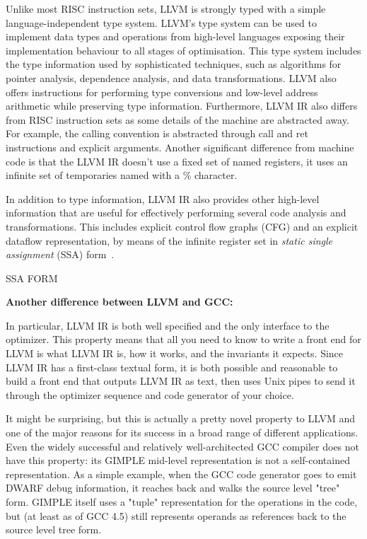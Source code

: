Unlike most RISC instruction sets, LLVM is strongly typed with a simple language-independent type system.
LLVM's type system can be used to implement data types and operations from high-level languages exposing their implementation behaviour to all stages of optimisation.
This type system includes the type information used by sophisticated techniques, such as algorithms for pointer analysis, dependence analysis, and data transformations.
LLVM also offers instructions for performing type conversions and low-level address arithmetic while preserving type information.
Furthermore, LLVM IR also differs from RISC instruction sets as some details of the machine are abstracted away.
For example, the calling convention is abstracted through call and ret instructions and explicit arguments.
Another significant difference from machine code is that the LLVM IR doesn't use a fixed set of named registers, it uses an infinite set of temporaries named with a \% character.

In addition to type information, LLVM IR also provides other high-level information that are useful for effectively performing several code analysis and transformations.
This includes explicit control flow graphs (CFG) and an explicit dataflow representation, by means of the infinite register set in \textit{static single assignment} (SSA) form~\citep{}.

SSA FORM

\textbf{Another difference between LLVM and GCC:}

In particular, LLVM IR is both well specified and the only interface to the optimizer.
This property means that all you need to know to write a front end for LLVM is what LLVM IR is, how it works, and the invariants it expects.
Since LLVM IR has a first-class textual form, it is both possible and reasonable to build a front end that outputs LLVM IR as text, then uses Unix pipes to send it through the optimizer sequence and code generator of your choice.

It might be surprising, but this is actually a pretty novel property to LLVM and one of the major reasons for its success in a broad range of different applications.
Even the widely successful and relatively well-architected GCC compiler does not have this property: its GIMPLE mid-level representation is not a self-contained representation.
As a simple example, when the GCC code generator goes to emit DWARF debug information, it reaches back and walks the source level "tree" form.
GIMPLE itself uses a "tuple" representation for the operations in the code, but (at least as of GCC 4.5) still represents operands as references back to the source level tree form.

